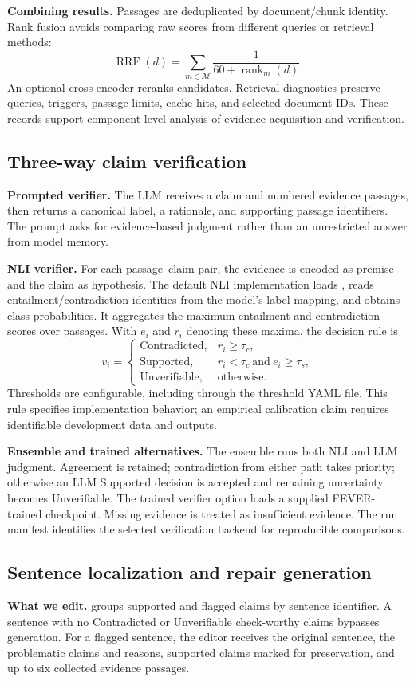 \documentclass[11pt,a4paper]{article}
\newcommand{\code}[1]{\texttt{\detokenize{#1}}}
\begin{document}
\textbf{Combining results.} Passages are deduplicated by document/chunk identity. Rank fusion avoids comparing raw scores from different queries or retrieval methods:
\[
 \operatorname{RRF}(d)=\sum_{m\in\mathcal{M}}\frac{1}{60+\operatorname{rank}_m(d)}.
\]
An optional cross-encoder reranks candidates. Retrieval diagnostics preserve queries, triggers, passage limits, cache hits, and selected document IDs. These records support component-level analysis of evidence acquisition and verification.

\subsection{Three-way claim verification}
\textbf{Prompted verifier.} The LLM receives a claim and numbered evidence passages, then returns a canonical label, a rationale, and supporting passage identifiers. The prompt asks for evidence-based judgment rather than an unrestricted answer from model memory.

\textbf{NLI verifier.} For each passage--claim pair, the evidence is encoded as premise and the claim as hypothesis. The default NLI implementation loads \code{cross-encoder/nli-deberta-v3-small}, reads entailment/contradiction identities from the model's label mapping, and obtains class probabilities. It aggregates the maximum entailment and contradiction scores over passages. With $e_i$ and $r_i$ denoting these maxima, the decision rule is
\[
 v_i=\begin{cases}
 \mathrm{Contradicted}, & r_i\geq\tau_c,\\
 \mathrm{Supported}, & r_i<\tau_c\ \text{and}\ e_i\geq\tau_s,\\
 \mathrm{Unverifiable}, & \text{otherwise}.
 \end{cases}
\]
Thresholds are configurable, including through the threshold YAML file. This rule specifies implementation behavior; an empirical calibration claim requires identifiable development data and outputs.

\textbf{Ensemble and trained alternatives.} The ensemble runs both NLI and LLM judgment. Agreement is retained; contradiction from either path takes priority; otherwise an LLM Supported decision is accepted and remaining uncertainty becomes Unverifiable. The trained verifier option loads a supplied FEVER-trained checkpoint. Missing evidence is treated as insufficient evidence. The run manifest identifies the selected verification backend for reproducible comparisons.

\subsection{Sentence localization and repair generation}
\textbf{What we edit.} \code{src/repair.py} groups supported and flagged claims by sentence identifier. A sentence with no Contradicted or Unverifiable check-worthy claims bypasses generation. For a flagged sentence, the editor receives the original sentence, the problematic claims and reasons, supported claims marked for preservation, and up to six collected evidence passages.
\end{document}

